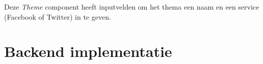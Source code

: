 Deze \textit{Theme} component heeft inputvelden om het thema een naam en een service (Facebook of Twitter) in te geven. 



\section{Backend implementatie}


%
%
